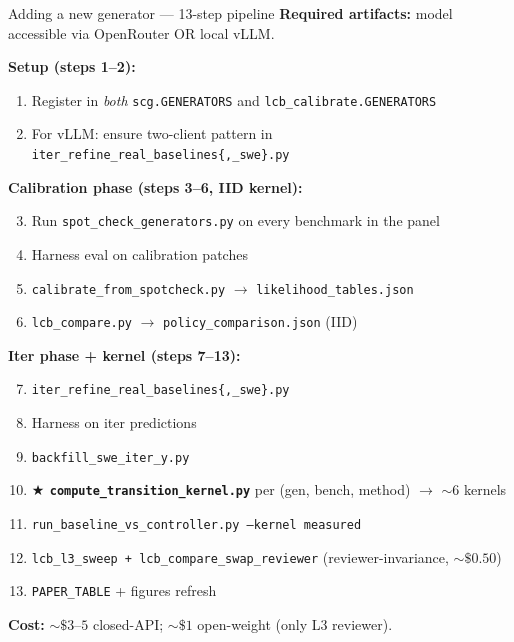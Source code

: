 \documentclass[10pt]{beamer}
\newcommand{\good}[1]{\textcolor{accentGreen}{\textbf{#1}}}
\newcommand{\info}[1]{\textcolor{primaryBlue}{\textbf{#1}}}
\begin{document}
\begin{frame}{Adding a new generator --- 13-step pipeline}
\vspace{0.1cm}
\info{Required artifacts:} model accessible via OpenRouter OR local vLLM.

\vspace{0.15cm}
\small
\textbf{Setup (steps 1--2):}
\begin{enumerate}\setlength\itemsep{0pt}
\item Register in \emph{both} \texttt{scg.GENERATORS} and \texttt{lcb\_calibrate.GENERATORS}
\item For vLLM: ensure two-client pattern in \texttt{iter\_refine\_real\_baselines\{,\_swe\}.py}
\end{enumerate}

\textbf{Calibration phase (steps 3--6, IID kernel):}
\begin{enumerate}\setcounter{enumi}{2}\setlength\itemsep{0pt}
\item Run \texttt{spot\_check\_generators.py} on every benchmark in the panel
\item Harness eval on calibration patches
\item \texttt{calibrate\_from\_spotcheck.py} $\to$ \texttt{likelihood\_tables.json}
\item \texttt{lcb\_compare.py} $\to$ \texttt{policy\_comparison.json} (IID)
\end{enumerate}

\textbf{Iter phase + kernel (steps 7--13):}
\begin{enumerate}\setcounter{enumi}{6}\setlength\itemsep{0pt}
\item \texttt{iter\_refine\_real\_baselines\{,\_swe\}.py}
\item Harness on iter predictions
\item \texttt{backfill\_swe\_iter\_y.py}
\item \good{$\bigstar$ \texttt{compute\_transition\_kernel.py}} per (gen, bench, method) $\to$ ${\sim}6$ kernels
\item \texttt{run\_baseline\_vs\_controller.py --kernel measured}
\item \texttt{lcb\_l3\_sweep + lcb\_compare\_swap\_reviewer} (reviewer-invariance, ${\sim}\$0.50$)
\item \texttt{PAPER\_TABLE} + figures refresh
\end{enumerate}

\info{Cost:} ${\sim}\$3$--$5$ closed-API; ${\sim}\$1$ open-weight (only L3 reviewer).
\end{frame}
\end{document}
